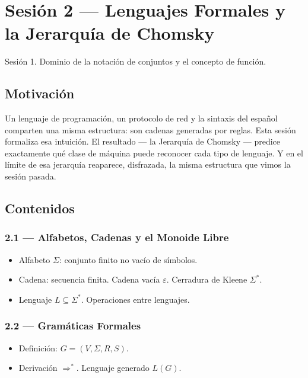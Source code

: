 \documentclass[11pt, letterpaper]{article}
\begin{document}
\newpage

\section{Sesi\'on 2 --- Lenguajes Formales y la Jerarqu\'ia de Chomsky}

\begin{prereqs}
Sesi\'on 1. Dominio de la notaci\'on de conjuntos y el concepto de funci\'on.
\end{prereqs}

\subsection*{Motivaci\'on}
Un lenguaje de programaci\'on, un protocolo de red y la sintaxis del espa\~nol comparten una misma estructura: son cadenas generadas por reglas. Esta sesi\'on formaliza esa intuici\'on. El resultado --- la Jerarqu\'ia de Chomsky --- predice exactamente qu\'e clase de m\'aquina puede reconocer cada tipo de lenguaje. Y en el l\'imite de esa jerarqu\'ia reaparece, disfrazada, la misma estructura que vimos la sesi\'on pasada.

\subsection{Contenidos}

\subsubsection{2.1 --- Alfabetos, Cadenas y el Monoide Libre}
\begin{itemize}
  \item Alfabeto $\Sigma$: conjunto finito no vac\'io de s\'imbolos.
  \item Cadena: secuencia finita. Cadena vac\'ia $\varepsilon$. Cerradura de Kleene $\Sigma^*$.
  \item Lenguaje $L\subseteq\Sigma^*$. Operaciones entre lenguajes.
\end{itemize}

\subsubsection{2.2 --- Gram\'aticas Formales}
\begin{itemize}
  \item Definici\'on: $G=(V,\Sigma,R,S)$.
  \item Derivaci\'on $\Rightarrow^*$. Lenguaje generado $L(G)$.
\end{itemize}
\end{document}
